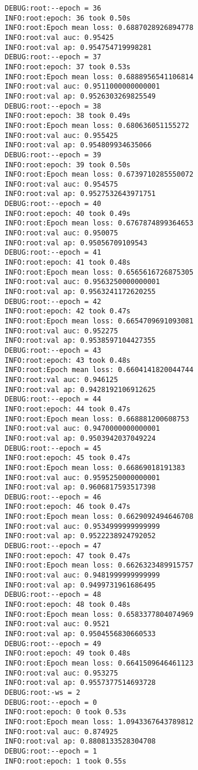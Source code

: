 \documentclass[11pt]{article}
\begin{document}
\begin{verbatim}
DEBUG:root:--epoch = 36
INFO:root:epoch: 36 took 0.50s
INFO:root:Epoch mean loss: 0.6887028926894778
INFO:root:val auc: 0.95425
INFO:root:val ap: 0.954754719998281
DEBUG:root:--epoch = 37
INFO:root:epoch: 37 took 0.53s
INFO:root:Epoch mean loss: 0.6888956541106814
INFO:root:val auc: 0.9511000000000001
INFO:root:val ap: 0.9526303269825549
DEBUG:root:--epoch = 38
INFO:root:epoch: 38 took 0.49s
INFO:root:Epoch mean loss: 0.680636051155272
INFO:root:val auc: 0.955425
INFO:root:val ap: 0.954809934635066
DEBUG:root:--epoch = 39
INFO:root:epoch: 39 took 0.50s
INFO:root:Epoch mean loss: 0.6739710285550072
INFO:root:val auc: 0.954575
INFO:root:val ap: 0.9527532643971751
DEBUG:root:--epoch = 40
INFO:root:epoch: 40 took 0.49s
INFO:root:Epoch mean loss: 0.6767874899364653
INFO:root:val auc: 0.950075
INFO:root:val ap: 0.95056709109543
DEBUG:root:--epoch = 41
INFO:root:epoch: 41 took 0.48s
INFO:root:Epoch mean loss: 0.6565616726875305
INFO:root:val auc: 0.9563250000000001
INFO:root:val ap: 0.9563241172620255
DEBUG:root:--epoch = 42
INFO:root:epoch: 42 took 0.47s
INFO:root:Epoch mean loss: 0.6654709691093081
INFO:root:val auc: 0.952275
INFO:root:val ap: 0.9538597104427355
DEBUG:root:--epoch = 43
INFO:root:epoch: 43 took 0.48s
INFO:root:Epoch mean loss: 0.6604141820044744
INFO:root:val auc: 0.946125
INFO:root:val ap: 0.9428192106912625
DEBUG:root:--epoch = 44
INFO:root:epoch: 44 took 0.47s
INFO:root:Epoch mean loss: 0.668881200608753
INFO:root:val auc: 0.9470000000000001
INFO:root:val ap: 0.9503942037049224
DEBUG:root:--epoch = 45
INFO:root:epoch: 45 took 0.47s
INFO:root:Epoch mean loss: 0.66869018191383
INFO:root:val auc: 0.9595250000000001
INFO:root:val ap: 0.9606817593517398
DEBUG:root:--epoch = 46
INFO:root:epoch: 46 took 0.47s
INFO:root:Epoch mean loss: 0.6629092494646708
INFO:root:val auc: 0.9534999999999999
INFO:root:val ap: 0.9522238924792052
DEBUG:root:--epoch = 47
INFO:root:epoch: 47 took 0.47s
INFO:root:Epoch mean loss: 0.6626323489915757
INFO:root:val auc: 0.9481999999999999
INFO:root:val ap: 0.9499731961686495
DEBUG:root:--epoch = 48
INFO:root:epoch: 48 took 0.48s
INFO:root:Epoch mean loss: 0.6583377804074969
INFO:root:val auc: 0.9521
INFO:root:val ap: 0.9504556830660533
DEBUG:root:--epoch = 49
INFO:root:epoch: 49 took 0.48s
INFO:root:Epoch mean loss: 0.6641509646461123
INFO:root:val auc: 0.953275
INFO:root:val ap: 0.9557377514693728
DEBUG:root:-ws = 2
DEBUG:root:--epoch = 0
INFO:root:epoch: 0 took 0.53s
INFO:root:Epoch mean loss: 1.0943367643789812
INFO:root:val auc: 0.874925
INFO:root:val ap: 0.8808133528304708
DEBUG:root:--epoch = 1
INFO:root:epoch: 1 took 0.55s

\end{verbatim}
\end{document}
